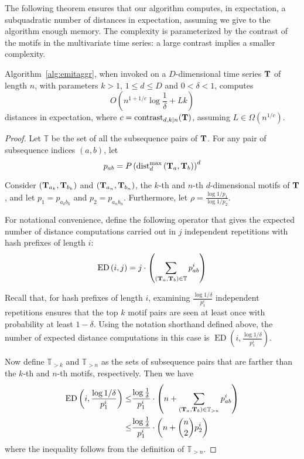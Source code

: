 The following theorem ensures that our algorithm computes, in expectation, a subquadratic number of distances
in expectation, assuming we give to the algorithm enough memory.
The complexity is parameterized by the contrast of the motifs in the multivariate time series:
a large contrast implies a smaller complexity.

\begin{theorem}
Algorithm~\ref{alg:emitaggr}, when invoked on a $D$-dimensional time series $\mathbf{T}$ of length $n$,
with parameters $k>1$, $1\le d\le D$ and $0 <\delta < 1$, computes
\[
  O\left(
    n^{1 + 1/c} \log\frac{1}{\delta} + Lk
  \right)
\]
distances in expectation, where $c=\operatorname{contrast}_{d,k|n}(\mathbf{T})$,
assuming $L \in \Omega\left(n^{1/c}\right)$.
\end{theorem}
\begin{proof}
\newcommand{\distcomps}[1]{\operatorname{ED}\left(#1\right)}
Let $\mathbb{T}$ be the set of all the subsequence pairs of $\mathbf{T}$.
For any pair of subsequence indices $(a, b)$, let
\[
p_{ab} = P\left(\operatorname{dist}^{\max}_{d}\left(\mathbf{T}_{a}, \mathbf{T}_{b}\right)\right)^d
\]

Consider 
$(\mathbf{T}_{a_k}, \mathbf{T}_{b_k})$
and
$(\mathbf{T}_{a_n}, \mathbf{T}_{b_n})$,
the $k$-th and $n$-th $d$-dimensional motifs of $\mathbf{T}$, and let
$p_1=p_{a_k b_k}$ and $p_2=p_{a_n b_n}$.
Furthermore, let
$\rho = \frac{\log 1/p_1}{\log 1/p_2}$.

For notational convenience, define the following operator that gives the expected number of
distance computations carried out in $j$ independent repetitions with hash prefixes
of length $i$:
\begin{equation*}
\distcomps{i, j}
=
j\cdot \left(
\sum_{(\subTa, \subTb) \in \mathbb{T}} p_{ab}^{i}
\right)
\end{equation*}

Recall that, for hash prefixes of length $i$, examining
$\frac{\log 1/\delta}{p_1^i}$ independent repetitions ensures that
the top $k$ motif pairs are seen at least once with probability at least $1-\delta$.
Using the notation shorthand defined above, the number of expected distance computations
in this case is
$
\distcomps{i, \frac{\log 1/\delta}{p_1^i}}
$.

Now define $\mathbb{T}_{>k}$ and $\mathbb{T}_{>n}$ as the sets of subsequence pairs
that are farther than the $k$-th and $n$-th motifs, respectively.
Then we have
\begin{equation}
\label{eq:bounding_T>n}
\begin{aligned}
\distcomps{i, \frac{\log 1/\delta}{p_1^i}}
\le&
\frac{\log\frac{1}{\delta}}{p_1^i}
\cdot
\left(
n +
\sum_{(\subTa, \subTb) \in \mathbb{T}_{>n}} p_{ab}^{i}
\right) \\
\le&
\frac{\log\frac{1}{\delta}}{p_1^i}
\cdot
\left(
n + {n \choose 2} p_2^i
\right)
\end{aligned}
\end{equation}
where the inequality follows from the definition of $\mathbb{T}_{>n}$.


\end{proof}
